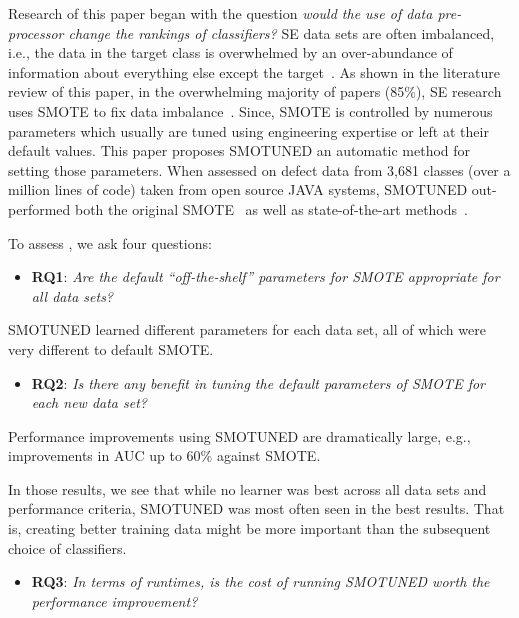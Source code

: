 \documentclass[sigconf]{acmart}
\newcommand{\bi}{\begin{itemize}[leftmargin=0.4cm]}
\newcommand{\ei}{\end{itemize}}
\theoremstyle{break}
\theoremstyle{break}
\newcommand{\sma}{{\sc SMOTE}}
\newcommand{\smb}{{\sc SMOTUNED}}
\begin{document}
Research of this paper began with the question {\em would the use of
data pre-processor change the rankings of classifiers?}
SE data
sets are often imbalanced, i.e., the data in the target class is overwhelmed by an over-abundance of information about everything else except the target~\cite{menzies2007problems}.
As shown in the literature review of this paper, in the overwhelming majority of papers (85\%), SE research uses {\sma} to fix data imbalance~\cite{chawla2002smote}. Since, {\sma} is controlled by numerous parameters which
usually are tuned using engineering expertise or left at their default
values. This paper proposes 
{\smb} an automatic method for setting those parameters.
When assessed on  defect data from 3,681	 classes (over a million lines of code) 
taken from open source JAVA systems,  {\smb} out-performed
both the original SMOTE~\cite{chawla2002smote} as well as state-of-the-art methods~\cite{bennin2017mahakil}.

To assess {\emb}, we ask four questions: 
 \bi\item
  \textbf{RQ1}:  {\em Are the default ``off-the-shelf'' parameters for {\sma} appropriate for
  all data sets?} 
  \ei
 \begin{lesson}{\smb} learned different parameters for each data set, all of which  were very different to default {\sma}.
 \end{lesson}
  \bi
  \item
  \textbf{RQ2}: {\em   Is  there any benefit in tuning the default parameters of {\sma} for
  each new data set?} 
  \ei
   \begin{lesson}Performance improvements using {\smb} are dramatically large, e.g., improvements in AUC up to 60\% against {\sma}.
 \end{lesson}
In those results, we see that  while no learner was best across all data sets and   performance criteria,
{\smb} was most often seen in the best results.
That is, creating better training data might be more important
than the subsequent choice of classifiers. 
 
  
   \bi
  \item
  \textbf{RQ3}: {\em  In terms of runtimes, is the cost of running {\smb} worth the performance improvement?}
  \ei
  
\end{document}
